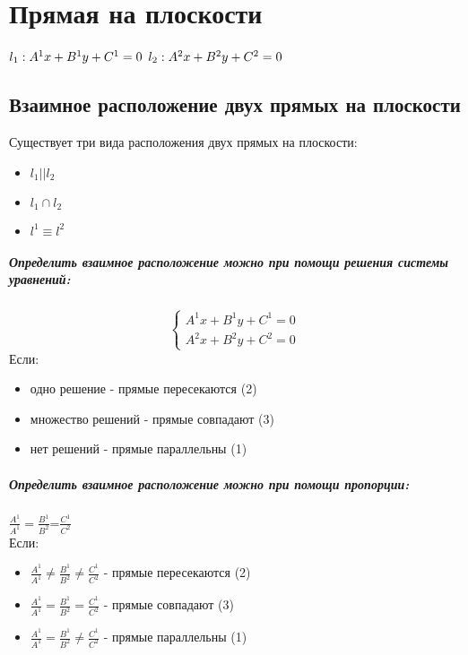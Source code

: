 \documentclass{book}
\begin{document}
\chapter{Прямая на плоскости}
$l_1: A^1x+B^1y+C^1=0\\$
$l_2: A^2x+B^2y+C^2=0\\$
\section{Взаимное расположение двух прямых на плоскости}
Существует три вида расположения двух прямых на плоскости:
\begin{itemize}
    \item $l_1||l_2$
    \item $l_1 \cap l_2$
    \item $l^1 \equiv l^2$
\end{itemize}
\paragraph*{Определить взаимное расположение можно при помощи решения системы уравнений:}
\begin{equation}
    \begin{cases}
        A^1x+B^1y+C^1=0\\
        A^2x+B^2y+C^2=0
    \end{cases}
\end{equation}
Если:
\begin{itemize}
    \item одно решение - прямые пересекаются (2)
    \item множество решений - прямые совпадают (3)
    \item нет решений - прямые параллельны (1)
\end{itemize}
\paragraph*{Определить взаимное расположение можно при помощи пропорции:}
$\frac{A^1}{A^1}=\frac{B^1}{B^2}$=$\frac{C^1}{C^2}$\\
Если:
\begin{itemize}
    \item $\frac{A^1}{A^1} \neq \frac{B^1}{B^2} \neq \frac{C^1}{C^2}$ - прямые пересекаются (2)
    \item $\frac{A^1}{A^1} = \frac{B^1}{B^2} = \frac{C^1}{C^2}$ - прямые совпадают (3)
    \item $\frac{A^1}{A^1} = \frac{B^1}{B^2} \neq \frac{C^1}{C^2}$ - прямые параллельны (1)
\end{itemize}
\end{document}
